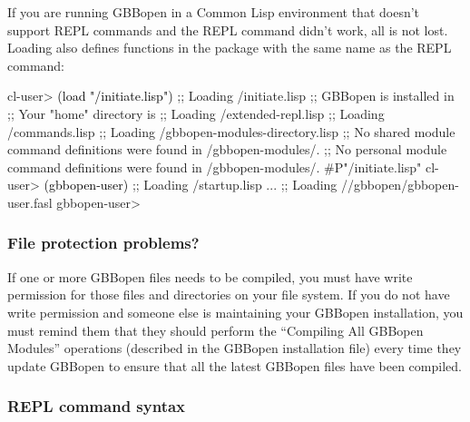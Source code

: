 \documentclass[10pt,twoside,english,pdftex]{article}
\begin{document}
If you are running GBBopen in a Common Lisp environment that doesn't support
REPL commands and the  REPL command didn't work,
all is not lost.  Loading 
also defines functions in the  package with the
same name as the REPL command:
%
\W\supp
\begin{example}
\textcolor{darkergray}{%
  cl-user> \textcolor{black}{(load "/initiate.lisp")}
  ;; Loading /initiate.lisp
  ;; GBBopen is installed in 
  ;; Your "home" directory is 
  ;;     Loading /extended-repl.lisp
  ;;     Loading /commands.lisp
  ;;     Loading /gbbopen-modules-directory.lisp
  ;; No shared module command definitions were found in /gbbopen-modules/.
  ;; No personal module command definitions were found in /gbbopen-modules/.
  #P"/initiate.lisp"
  cl-user> \textcolor{black}{(gbbopen-user)}
  ;; Loading /startup.lisp
     ...
  ;; Loading //gbbopen/gbbopen-user.fasl
  gbbopen-user>}
\end{example}

\subsubsection*{File protection problems?}

%
%
%
%
%
If one or more GBBopen files needs to be compiled, you must have write
permission for those files and directories on your file system.  If you do not
have write permission and someone else is maintaining your GBBopen
installation, you must remind them that they should perform the ``Compiling
All GBBopen Modules'' operations (described in the GBBopen installation
 file) every time they update GBBopen to ensure that all the
latest GBBopen files have been compiled.

\subsubsection*{REPL command syntax}
\label{sec:REPL-command-syntax}
\end{document}
